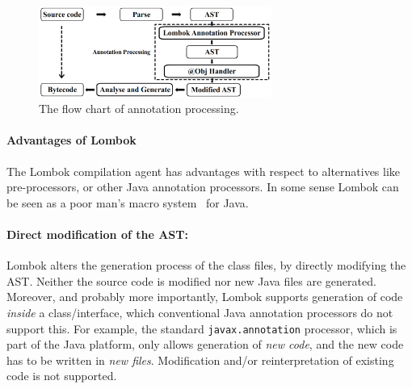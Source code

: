 
\begin{figure}[t]
\centering
\includegraphics[width=3in]{pdfs/lombok3.png}
\caption{The flow chart of \mixin annotation processing.
}
\label{fig:lombok}
\end{figure}


\paragraph{Advantages of Lombok}
The Lombok compilation agent has advantages with respect to alternatives like
pre-processors, or other Java annotation processors. In some sense
Lombok can be seen as a poor man's macro system~\cite{} for Java.

\paragraph{Direct modification of the AST:}
Lombok alters the generation process of the class files,
by directly modifying the AST. Neither the source code is modified nor
new Java files are generated. Moreover, and probably more importantly,
Lombok supports generation of code \emph{inside} a class/interface,
which conventional Java annotation processors do not support this. For
example, the standard \texttt{javax.annotation} processor, which is part of the
Java platform, only allows generation of \emph{new code}, and the
new code has to be written in \emph{new files}. Modification and/or
reinterpretation of existing code is not supported.

